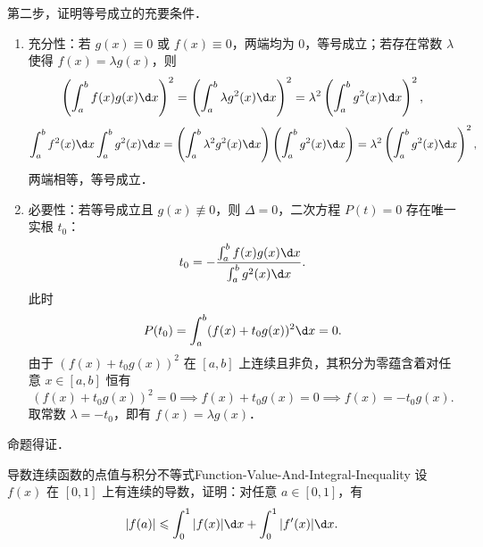 \begin{myproof}
    第二步，证明等号成立的充要条件．
    \begin{enumerate}
        \item 充分性：若 $g(x) \equiv 0$ 或 $f(x) \equiv 0$，两端均为 $0$，等号成立；若存在常数 $\lambda$ 使得 $f(x) = \lambda g(x)$，则
              \begin{equation}
                  \left(\int_a^b f(x)g(x)\d x\right)^2 = \left(\int_a^b \lambda g^2(x)\d x\right)^2 = \lambda^2 \left(\int_a^b g^2(x)\d x\right)^2,
              \end{equation}
              \begin{equation}
                  \int_a^b f^2(x)\d x \int_a^b g^2(x)\d x = \left(\int_a^b \lambda^2 g^2(x)\d x\right)\left(\int_a^b g^2(x)\d x\right) = \lambda^2 \left(\int_a^b g^2(x)\d x\right)^2,
              \end{equation}
              两端相等，等号成立．
        \item 必要性：若等号成立且 $g(x) \not\equiv 0$，则 $\Delta = 0$，二次方程 $P(t) = 0$ 存在唯一实根 $t_0$：
              \begin{equation}
                  t_0 = -\frac{\int_a^b f(x)g(x)\d x}{\int_a^b g^2(x)\d x}.
              \end{equation}
              此时
              \begin{equation}
                  P(t_0) = \int_a^b (f(x) + t_0 g(x))^2 \d x = 0.
              \end{equation}
              由于 $(f(x) + t_0 g(x))^2$ 在 $[a, b]$ 上连续且非负，其积分为零蕴含着对任意 $x \in [a, b]$ 恒有
              \begin{equation}
                  (f(x) + t_0 g(x))^2 = 0 \implies f(x) + t_0 g(x) = 0 \implies f(x) = -t_0 g(x).
              \end{equation}
              取常数 $\lambda = -t_0$，即有 $f(x) = \lambda g(x)$．
    \end{enumerate}
    命题得证．
\end{myproof}

\begin{problem}{导数连续函数的点值与积分不等式}{Function-Value-And-Integral-Inequality}
    设 $f(x)$ 在 $[0, 1]$ 上有连续的导数，证明：对任意 $a \in [0, 1]$，有
    \begin{equation}
        |f(a)| \leqslant \int_0^1 |f(x)| \d x + \int_0^1 |f'(x)| \d x.
    \end{equation}
\end{problem}

